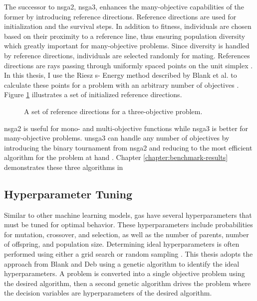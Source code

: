 The successor to \ac{nsga2}, \ac{nsga3}, enhances the many-objective capabilities of 
the former by introducing reference directions. Reference directions are used for 
initialization and the survival steps. In addition to fitness, individuals are chosen 
based on their proximity to a reference line, thus ensuring population diversity which
greatly important for many-objective problems. Since diversity is handled by reference
directions, individuals are selected randomly for mating. References directions are 
rays passing through uniformly spaced points on the unit simplex 
\cite{seada_unified_2016, blank_generating_2021}. In this thesis, I use the Riesz s-
Energy method described by Blank et al. to calculate these points for a problem with an 
arbitrary number of objectives \cite{blank_generating_2021}. Figure \ref{fig:ref-dirs} 
illustrates a set of initialized reference directions.

\begin{figure}[h]
  \centering
  \resizebox{0.6\columnwidth}{!}{}
  \caption{A set of reference directions for a three-objective problem.}
  \label{fig:ref-dirs}
\end{figure}

\ac{nsga2} is useful for mono- and multi-objective functions while \ac{nsga3} is better
for many-objective problems. \ac{unsga3} can handle any number of objectives by 
introducing the binary tournament from \ac{nsga2} and reducing to the most efficient 
algorithm for the problem at hand \cite{seada_unified_2016}. Chapter \ref{chapter:benchmark-results} demonstrates these three algorithms in 

\subsection{Hyperparameter Tuning}
Similar to other machine learning models, \acp{ga} have several hyperparameters that
must be tuned for optimal behavior. These hyperparameters include probabilities for mutation, crossover, and selection, as well as the number of parents, number of offspring, and population size. Determining ideal hyperparameters is often 
performed using either a grid search or random sampling \cite{bergstra_random_2012}. 
This thesis adopts the approach from Blank and Deb \cite{blank_pymoo_2020} using
a genetic algorithm to identify the ideal hyperparameters. A problem is converted into a single objective problem using the desired algorithm, then a second genetic algorithm drives the problem where the decision variables are hyperparameters of the desired algorithm.

